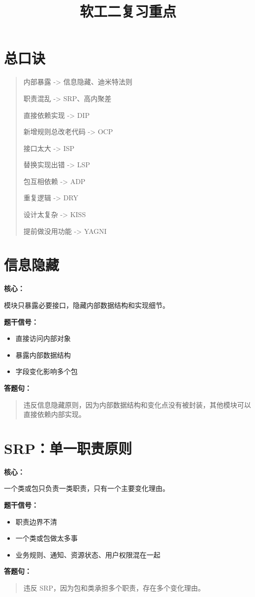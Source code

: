 \documentclass[UTF8,zihao=-4]{ctexart}
\title{\textbf{软工二复习重点}}
\author{}
\date{}
\newcommand{\principle}[1]{%
  \section*{\color{TitleBlue}#1}
}
\newcommand{\labeltext}[1]{%
  \textbf{#1}
}
\newenvironment{answerbox}{%
  \begin{quote}\small\color{TextGray}
}{%
  \end{quote}
}
\begin{document}
\maketitle

\section*{\color{TitleBlue}总口诀}

\begin{answerbox}
内部暴露 -> 信息隐藏、迪米特法则

职责混乱 -> SRP、高内聚差

直接依赖实现 -> DIP

新增规则总改老代码 -> OCP

接口太大 -> ISP

替换实现出错 -> LSP

包互相依赖 -> ADP

重复逻辑 -> DRY

设计太复杂 -> KISS

提前做没用功能 -> YAGNI
\end{answerbox}

\principle{信息隐藏}

\labeltext{核心：}
模块只暴露必要接口，隐藏内部数据结构和实现细节。

\labeltext{题干信号：}
\begin{itemize}
  \item 直接访问内部对象
  \item 暴露内部数据结构
  \item 字段变化影响多个包
\end{itemize}

\labeltext{答题句：}
\begin{answerbox}
违反信息隐藏原则，因为内部数据结构和变化点没有被封装，其他模块可以直接依赖内部实现。
\end{answerbox}

\principle{SRP：单一职责原则}

\labeltext{核心：}
一个类或包只负责一类职责，只有一个主要变化理由。

\labeltext{题干信号：}
\begin{itemize}
  \item 职责边界不清
  \item 一个类或包做太多事
  \item 业务规则、通知、资源状态、用户权限混在一起
\end{itemize}

\labeltext{答题句：}
\begin{answerbox}
违反 SRP，因为包和类承担多个职责，存在多个变化理由。
\end{answerbox}
\end{document}
